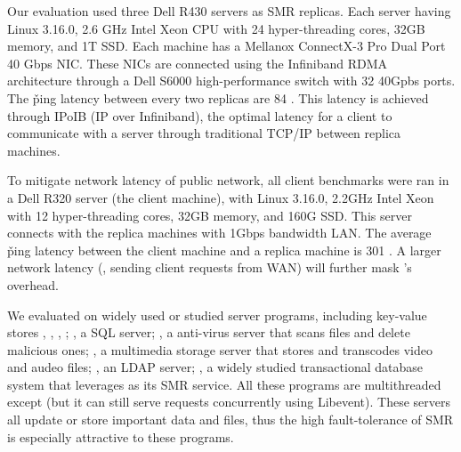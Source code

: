 Our evaluation used three Dell R430 servers as SMR replicas. Each server having 
Linux 3.16.0, 2.6 GHz Intel Xeon CPU with 24 hyper-threading cores, 32GB 
memory, and 1T SSD. Each machine has a Mellanox ConnectX-3 Pro Dual Port 40 Gbps 
NIC. These NICs are connected using the Infiniband RDMA architecture through a 
Dell S6000 high-performance switch with 32 40Gpbs ports. The \v{ping} latency 
between every two replicas are 84 \us. This latency is achieved through IPoIB 
(IP over Infiniband), the optimal latency for a client to communicate with a 
server through traditional TCP/IP between replica machines.

To mitigate network latency of public network, all client benchmarks were ran 
in a Dell R320 server (the client machine), with Linux 3.16.0, 2.2GHz Intel 
Xeon with 12 hyper-threading cores, 32GB memory, and 160G SSD. This server 
connects with the replica machines with 1Gbps bandwidth LAN. The average 
\v{ping} latency between the client machine and a replica machine is 301 \us. A 
larger network latency (\eg, sending client requests from WAN) will further 
mask \xxx's overhead.

We evaluated \xxx on \nprog widely used or studied server programs, including 
\nkvprog key-value stores \redis, \memcached, \ssdb, \mongodb; \mysql, a SQL 
server; \clamav, a anti-virus server that scans files and delete malicious ones; 
\mediatomb, a multimedia storage server that stores and transcodes video and 
audeo files; \openldap, an LDAP server; \calvin, a widely studied transactional 
database system that leverages \zookeeper as its SMR service. All these programs 
are multithreaded except \redis (but it can still serve requests concurrently 
using Libevent). These servers all update or store important data and files, 
thus the high fault-tolerance of SMR is especially attractive to these programs.

